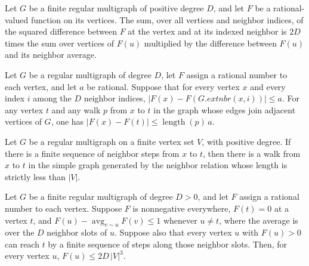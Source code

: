 \begin{theorem}
\label{Randomized.RegularMultigraph.sum_sq_eq_energy}
\leanok
{}
Let $G$ be a finite regular multigraph of positive degree $D$, and let $F$ be a
rational-valued function on its vertices. The sum, over all vertices and neighbor
indices, of the squared difference between $F$ at the vertex and at its indexed neighbor
is $2D$ times the sum over vertices of $F(u)$ multiplied by the difference between
$F(u)$ and its neighbor average.
\end{theorem}

\begin{theorem}
\label{Randomized.RegularMultigraph.abs_sub_le_length_mul}
\leanok
{}
Let $G$ be a regular multigraph of degree $D$, let $F$ assign a rational number to each
vertex, and let $a$ be rational. Suppose that for every vertex $x$ and every index $i$
among the $D$ neighbor indices, $|F(x)-F(G.	ext{nbr}(x,i))|\le a$. For any vertex $t$
and any walk $p$ from $x$ to $t$ in the graph whose edges join adjacent vertices of $G$,
one has $|F(x)-F(t)|\le \operatorname{length}(p)\,a$.
\end{theorem}

\begin{theorem}
\label{Randomized.RegularMultigraph.exists_short_walk}
\leanok
{}
Let $G$ be a regular multigraph on a finite vertex set $V$, with positive degree. If
there is a finite sequence of neighbor steps from $x$ to $t$, then there is a walk from
$x$ to $t$ in the simple graph generated by the neighbor relation whose length is
strictly less than $|V|$.
\end{theorem}

\begin{theorem}
\label{Randomized.RegularMultigraph.le_of_energy}
\leanok
{}
Let $G$ be a finite regular multigraph of degree $D>0$, and let $F$ assign a rational
number to each vertex. Suppose $F$ is nonnegative everywhere, $F(t)=0$ at a vertex $t$,
and $F(u)-\operatorname{avg}_{v\sim u}F(v)\le 1$ whenever $u\ne t$, where the average is
over the $D$ neighbor slots of $u$. Suppose also that every vertex $u$ with $F(u)>0$ can
reach $t$ by a finite sequence of steps along those neighbor slots. Then, for every
vertex $u$, $F(u)\le 2D\,|V|^3$.
\end{theorem}

